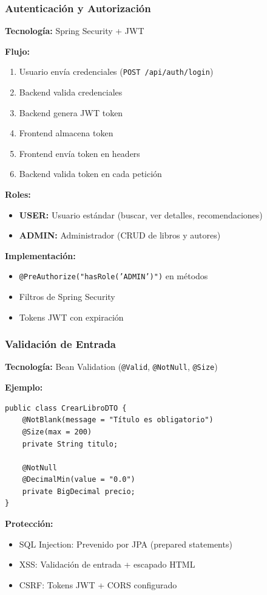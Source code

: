 \documentclass[aspectratio=169]{beamer}
\begin{document}
\begin{frame}
\frametitle{Autenticación y Autorización}

\textbf{Tecnología:} Spring Security + JWT

\textbf{Flujo:}
\begin{enumerate}
\item Usuario envía credenciales (\texttt{POST /api/auth/login})
\item Backend valida credenciales
\item Backend genera JWT token
\item Frontend almacena token
\item Frontend envía token en headers
\item Backend valida token en cada petición
\end{enumerate}

\textbf{Roles:}
\begin{itemize}
\item \textbf{USER:} Usuario estándar (buscar, ver detalles, recomendaciones)
\item \textbf{ADMIN:} Administrador (CRUD de libros y autores)
\end{itemize}

\textbf{Implementación:}
\begin{itemize}
\item \texttt{@PreAuthorize("hasRole('ADMIN')")} en métodos
\item Filtros de Spring Security
\item Tokens JWT con expiración
\end{itemize}

\end{frame}

\begin{frame}
\frametitle{Validación de Entrada}

\textbf{Tecnología:} Bean Validation (\texttt{@Valid}, \texttt{@NotNull}, \texttt{@Size})

\textbf{Ejemplo:}
\begin{verbatim}
public class CrearLibroDTO {
    @NotBlank(message = "Título es obligatorio")
    @Size(max = 200)
    private String titulo;
    
    @NotNull
    @DecimalMin(value = "0.0")
    private BigDecimal precio;
}
\end{verbatim}

\textbf{Protección:}
\begin{itemize}
\item SQL Injection: Prevenido por JPA (prepared statements)
\item XSS: Validación de entrada + escapado HTML
\item CSRF: Tokens JWT + CORS configurado
\end{itemize}

\end{frame}
\end{document}
